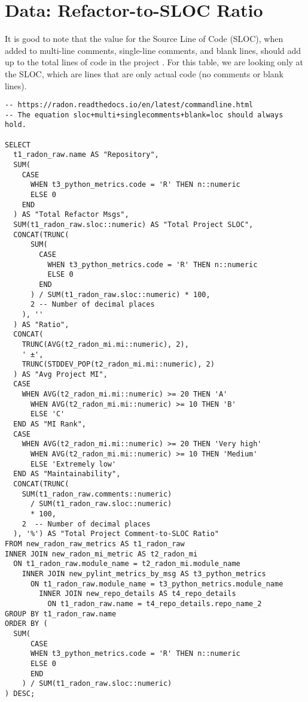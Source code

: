 \section{Data: Refactor-to-SLOC Ratio} \label{appendixRefactorRatio}

It is good to note that the value for the Source Line of Code (SLOC), when added to multi-line comments, single-line comments, and blank lines, should add up to the total lines of code in the project \cite{radon:docs}. For this table, we are looking only at the SLOC, which are lines that are only actual code (no comments or blank lines).

\begin{singlespace}
  \begin{verbatim}
-- https://radon.readthedocs.io/en/latest/commandline.html
-- The equation sloc+multi+singlecomments+blank=loc should always hold.

SELECT
  t1_radon_raw.name AS "Repository",
  SUM(
    CASE
      WHEN t3_python_metrics.code = 'R' THEN n::numeric
      ELSE 0
    END
  ) AS "Total Refactor Msgs",
  SUM(t1_radon_raw.sloc::numeric) AS "Total Project SLOC",
  CONCAT(TRUNC(
      SUM(
        CASE
          WHEN t3_python_metrics.code = 'R' THEN n::numeric
          ELSE 0
        END
      ) / SUM(t1_radon_raw.sloc::numeric) * 100,
      2 -- Number of decimal places
    ), ''
  ) AS "Ratio",
  CONCAT(
    TRUNC(AVG(t2_radon_mi.mi::numeric), 2), 
    ' ±', 
    TRUNC(STDDEV_POP(t2_radon_mi.mi::numeric), 2)
  ) AS "Avg Project MI",
  CASE
    WHEN AVG(t2_radon_mi.mi::numeric) >= 20 THEN 'A'
      WHEN AVG(t2_radon_mi.mi::numeric) >= 10 THEN 'B'
      ELSE 'C'
  END AS "MI Rank",
  CASE
    WHEN AVG(t2_radon_mi.mi::numeric) >= 20 THEN 'Very high'
      WHEN AVG(t2_radon_mi.mi::numeric) >= 10 THEN 'Medium'
      ELSE 'Extremely low'
  END AS "Maintainability",
  CONCAT(TRUNC(
    SUM(t1_radon_raw.comments::numeric) 
      / SUM(t1_radon_raw.sloc::numeric) 
      * 100, 
    2  -- Number of decimal places
  ), '%') AS "Total Project Comment-to-SLOC Ratio"
FROM new_radon_raw_metrics AS t1_radon_raw
INNER JOIN new_radon_mi_metric AS t2_radon_mi
  ON t1_radon_raw.module_name = t2_radon_mi.module_name
    INNER JOIN new_pylint_metrics_by_msg AS t3_python_metrics
      ON t1_radon_raw.module_name = t3_python_metrics.module_name
        INNER JOIN new_repo_details AS t4_repo_details
          ON t1_radon_raw.name = t4_repo_details.repo_name_2
GROUP BY t1_radon_raw.name
ORDER BY (
  SUM(
      CASE
      WHEN t3_python_metrics.code = 'R' THEN n::numeric
      ELSE 0
      END
    ) / SUM(t1_radon_raw.sloc::numeric)
) DESC; 
  \end{verbatim}
\end{singlespace}

